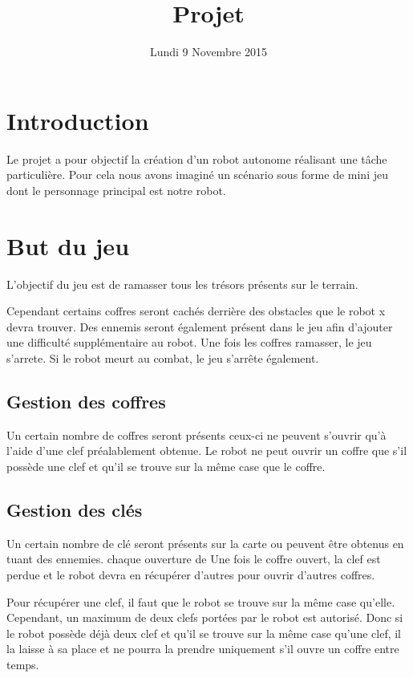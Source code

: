 \documentclass[a4paper 12pts]{article}
\title{Projet}
\date{Lundi 9 Novembre 2015}
\author{}
\begin{document}
\maketitle

\section{Introduction}
Le projet a pour objectif la création d'un robot autonome réalisant une tâche particulière.
Pour cela nous avons imaginé un scénario sous forme de mini jeu dont le personnage principal est notre robot.

\section{But du jeu}


L'objectif du jeu est de ramasser tous les trésors présents sur le terrain.


Cependant certains coffres seront cachés derrière des obstacles que le robot x devra trouver. Des ennemis seront également présent dans le jeu afin d'ajouter une difficulté supplémentaire au robot.
Une fois les coffres ramasser, le jeu s'arrete.
Si le robot meurt au combat, le jeu s'arrête également.


\subsection{Gestion des coffres}

Un certain nombre de coffres seront présents ceux-ci ne peuvent s'ouvrir qu'à l'aide d'une clef préalablement obtenue.
Le robot ne peut ouvrir un coffre que s'il possède une clef et qu'il se trouve sur la même case que le coffre.


\subsection{Gestion des clés}

Un certain nombre de clé seront présents sur la carte ou peuvent être obtenus en tuant des ennemies.
chaque ouverture de 
Une fois le coffre ouvert, la clef est perdue et le robot devra en récupérer d'autres pour ouvrir d'autres coffres.

Pour récupérer une clef, il faut que le robot se trouve sur la même case qu'elle. Cependant, un maximum de deux clefs portées par le robot est autorisé. Donc si le robot possède déjà deux clef et qu'il se trouve sur la même case qu'une clef, il la laisse à sa place et ne pourra la prendre uniquement s'il ouvre un coffre entre temps.
\end{document}
